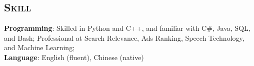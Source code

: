 \begin{resume}







\vspace*{-14pt}
\section{\textsc{Skill}}
\textbf{Programming}: Skilled in Python and C++, and familiar with C\#, Java, SQL, and Bash; Professional at Search Relevance, Ads Ranking, Speech Technology, and Machine Learning;  \\
\vspace*{-8pt}
\newline
\textbf{Language}: English (fluent), Chinese (native)


\end{resume}
